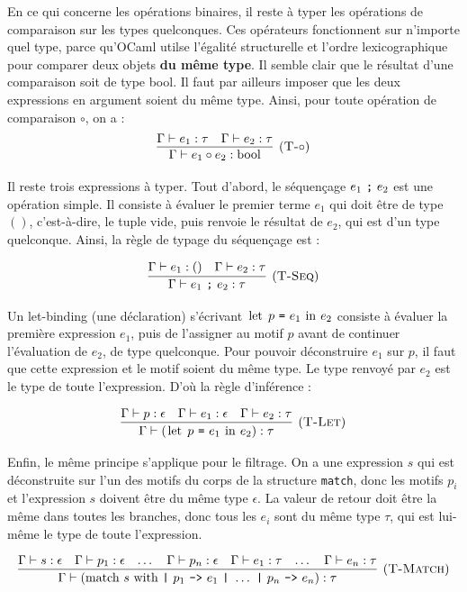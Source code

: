 \documentclass[11pt]{article}
\begin{document}
En ce qui concerne les opérations binaires, il reste à typer les opérations de comparaison sur les types quelconques. Ces opérateurs fonctionnent sur n'importe quel type, parce qu'OCaml utilse l'égalité structurelle et l'ordre lexicographique pour comparer deux objets \textbf{du même type}. Il semble clair que le résultat d'une comparaison soit de type bool. Il faut par ailleurs imposer que les deux expressions en argument soient du même type. Ainsi, pour toute opération de comparaison $\circ$, on a :
$$
\infer[(\text{\scshape{T-$\circ$}})] 
{\Gamma \vdash e_1\circ e_2:\text{bool}}
{\Gamma \vdash e_1:\tau&\Gamma \vdash e_2:\tau}
$$

Il reste trois expressions à typer. Tout d'abord, le séquençage $e_1~\verb|;|~e_2$ est une opération simple. Il consiste à évaluer le premier terme $e_1$ qui doit être de type $()$, c'est-à-dire, le tuple vide, puis renvoie le résultat de $e_2$, qui est d'un type quelconque. Ainsi, la règle de typage du séquençage est :

$$
\infer[(\text{\scshape{T-Seq}})] 
{\Gamma \vdash e_1~\texttt{;}~e_2:\tau}
{\Gamma \vdash e_1:()&\Gamma\vdash e_2:\tau}
$$

Un let-binding (une déclaration) s'écrivant $\text{\lstinline|let|}~p~\verb|=|~e_1~\text{\lstinline|in|}~e_2$ consiste à évaluer la première expression $e_1$, puis de l'assigner au motif $p$ avant de continuer l'évaluation de $e_2$, de type quelconque. Pour pouvoir déconstruire $e_1$ sur $p$, il faut que cette expression et le motif soient du même type. Le type renvoyé par $e_2$ est le type de toute l'expression. D'où la règle d'inférence :

$$
\infer[(\text{\scshape{T-Let}})] 
{\Gamma \vdash (\text{\lstinline|let|}~p~\texttt{=}~e_1~\text{\lstinline|in|}~e_2):\tau}
{
    \Gamma \vdash p:\epsilon
    &
    \Gamma \vdash e_1:\epsilon
    &
    \Gamma\vdash e_2:\tau
}
$$

Enfin, le même principe s'applique pour le filtrage. On a une expression $s$ qui est déconstruite sur l'un des motifs du corps de la structure \lstinline|match|, donc les motifs $p_i$ et l'expression $s$ doivent être du même type $\epsilon$. La valeur de retour doit être la même dans toutes les branches, donc tous les $e_i$ sont du même type $\tau$, qui est lui-même le type de toute l'expression.

$$
\infer[(\text{\scshape{T-Match}})] 
{
    \Gamma \vdash (\text{\lstinline|match|}~s~\text{\lstinline|with|}~\texttt{|}~p_1~\texttt{->}~e_1~\texttt{|}~\dots~\texttt{|}~p_n~\texttt{->}~e_n):\tau
    }
{
    \Gamma \vdash s:\epsilon
    &
    \Gamma \vdash p_1:\epsilon
    &
    \dots
    &
    \Gamma \vdash p_n:\epsilon
    &
    \Gamma\vdash e_1:\tau
    &
    \dots
    &
    \Gamma\vdash e_n:\tau
}
$$
\end{document}
